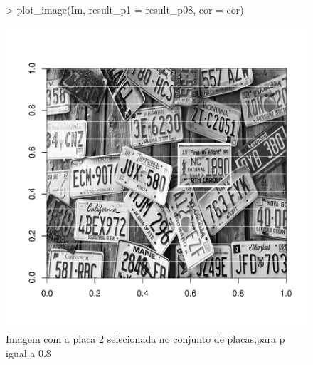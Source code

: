 \documentclass[12pt]{article}
\begin{document}
\begin{figure}
\centering
\begin{Schunk}
\begin{Sinput}
> plot_image(Im, result_p1 = result_p08, cor = cor)
\end{Sinput}
\end{Schunk}
\includegraphics{template_matching-025}
\caption{Imagem com a placa 2 selecionada no conjunto de placas,para p igual a 0.8}
\label{placa1selecionada}
\end{figure}
\end{document}
